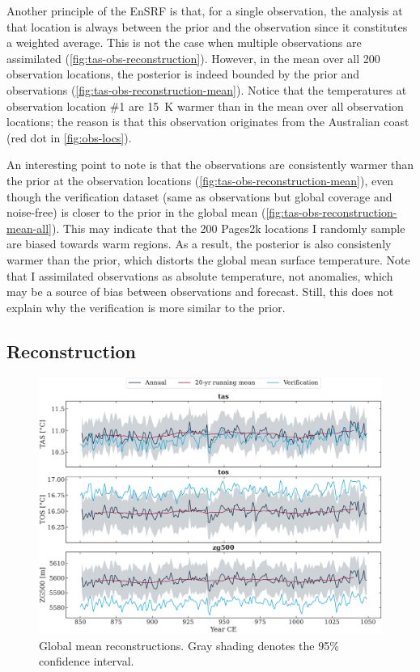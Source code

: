 \documentclass[parskip=half,DIV=16]{scrartcl}
\begin{document}
Another principle of the \gls{EnSRF} is that, for a single observation, the analysis at that location is always between the prior and the observation since it constitutes a weighted average. This is not the case when multiple observations are assimilated (\cref{fig:tas-obs-reconstruction}). However, in the mean over all 200 observation locations, the posterior is indeed bounded by the prior and observations (\cref{fig:tas-obs-reconstruction-mean}). Notice that the temperatures at observation location \#1 are \qty{15}{\K} warmer than in the mean over all observation locations; the reason is that this observation originates from the Australian coast (red dot in \cref{fig:obs-locs}).

An interesting point to note is that the observations are consistently warmer than the prior at the observation locations (\cref{fig:tas-obs-reconstruction-mean}), even though the verification dataset (same as observations but global coverage and noise-free) is closer to the prior in the global mean (\cref{fig:tas-obs-reconstruction-mean-all}). This may indicate that the 200 Pages2k locations I randomly sample are biased towards warm regions. As a result, the posterior is also consistenly warmer than the prior, which distorts the global mean surface temperature. Note that I assimilated observations as absolute temperature, not anomalies, which may be a source of bias between observations and forecast. Still, this does not explain why the verification is more similar to the prior.




\subsection{Reconstruction}

\begin{figure}[h]
    \centering
    \includegraphics{figures/plots/field_reconstruction_mean.pdf}
    \caption{Global mean reconstructions. Gray shading denotes the 95\% confidence interval.}
    \label{fig:reconstruction-mean}
\end{figure}
\end{document}
